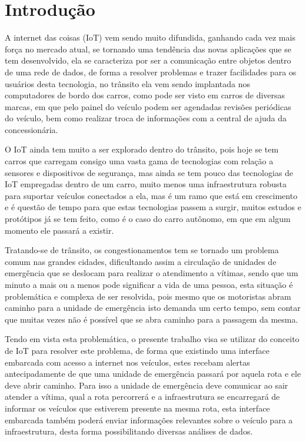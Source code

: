 \chapter{Introdução}
A internet das coisas (IoT) vem sendo muito difundida, ganhando cada vez mais força no mercado atual, se tornando uma tendência das novas aplicações que se tem desenvolvido, ela se caracteriza por ser a comunicação entre objetos dentro de uma rede de dados, de forma a resolver problemas e trazer facilidades para os usuários desta tecnologia, no trânsito ela vem sendo implantada nos computadores de bordo dos carros, como pode ser visto em carros de diversas marcas, em que pelo painel do veículo podem ser agendadas revisões periódicas do veículo, bem como realizar troca de informações com a central de ajuda da concessionária.~\cite{chevrolet}

O IoT ainda tem muito a ser explorado dentro do trânsito, pois hoje se tem carros que carregam consigo uma vasta gama de tecnologias com relação a sensores e dispositivos de segurança, mas ainda se tem pouco das tecnologias de IoT empregadas dentro de um carro, muito menos uma infraestrutura robusta para suportar veículos conectados a ela, mas é um ramo que está em crescimento e é questão de tempo para que estas tecnologias passem a surgir, muitos estudos e protótipos já se tem feito, como é o caso do carro autônomo, em que em algum momento ele passará a existir.

Tratando-se de trânsito, os congestionamentos tem se tornado um problema comum nas grandes cidades, dificultando assim a circulação de unidades de emergência que se deslocam para realizar o atendimento a vítimas, sendo que um minuto a mais ou a menos pode significar a vida de uma pessoa, esta situação é problemática e complexa de ser resolvida, pois mesmo que os motoristas abram caminho para a unidade de emergência isto demanda um certo tempo, sem contar que muitas vezes não é possível que se abra caminho para a passagem da mesma.

Tendo em vista esta problemática, o presente trabalho visa se utilizar do conceito de IoT para resolver este problema, de forma que existindo uma interface embarcada com acesso a internet nos veículos, estes recebam alertas antecipadamente de que uma unidade de emergência passará por aquela rota e ele deve abrir caminho. Para isso a unidade de emergência deve comunicar ao sair atender a vítima, qual a rota percorrerá e a infraestrutura se encarregará de informar os veículos que estiverem presente na mesma rota, esta interface embarcada também poderá enviar informações relevantes sobre o veículo para  a infraestrutura, desta forma possibilitando diversas análises de dados.

